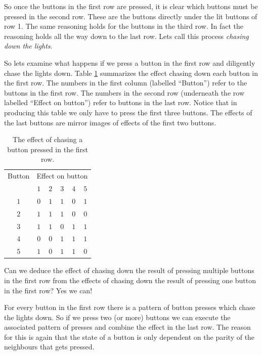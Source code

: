 So once the buttons in the first row are pressed, it is clear which buttons must
be pressed in the second row. These are the buttons directly under the lit
buttons of row 1. The same reasoning holds for the buttons in the third row. In
fact the reasoning holds all the way down to the last row. Lets call this
process \emph{chasing down the lights}.

So lets examine what happens if we press a button in the first row and
diligently chase the lights down. Table \ref{table:effects} summarizes the
effect chasing down each button in the first row.
The numbers in the first column (labelled ``Button'') refer to the buttons in
the first row. The numbers in the second row (underneath the row labelled
``Effect on button'') refer to buttons in the last row.
Notice that in producing this table we only have to press the first three
buttons. The effects of the last buttons are mirror images of effects of the
first two buttons.
\begin{table}
	\begin{center}
		\begin{tabular}{|c|c|c|c|c|c|}
			\hline
			Button & \multicolumn{5}{c|}{Effect on button} \\\cline{2-6}
			& $1$ & $2$ & $3$ & $4$ & $5$ \\
			\hline
			$1$ & $0$ & $1$ & $1$ & $0$ & $1$ \\
			$2$ & $1$ & $1$ & $1$ & $0$ & $0$ \\
			$3$ & $1$ & $1$ & $0$ & $1$ & $1$ \\
			$4$ & $0$ & $0$ & $1$ & $1$ & $1$ \\
			$5$ & $1$ & $0$ & $1$ & $1$ & $0$ \\
			\hline
		\end{tabular}
	\end{center}
	\caption{The effect of chasing a button pressed in the first
	row.}\label{table:effects}
\end{table} 

Can we deduce the effect of chasing down the result of pressing multiple buttons
in the first row from the effects of chasing down the result of pressing one
button in the first row? Yes we can!

For every button in the first row there is a pattern of button presses which
chase the lights down. So if we press two (or more) buttons we can execute the
associated pattern of presses and combine the effect in the last row. The reason
for this is again that the state of a button is only dependent on the parity of
the neighbours that gets pressed.

